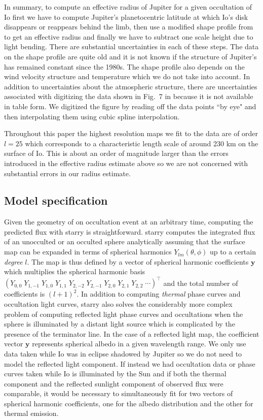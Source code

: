 \documentclass[modern]{aastex62}
\begin{document}
In summary, to compute an effective radius of Jupiter for a given occultation of Io first we have to compute Jupiter's planetocentric latitude at which Io's disk disappears or reappears behind the limb, then use a modified shape profile from \cite{lindal1981} to get an effective radius and finally we have to subtract one scale height due to light bending.
There are substantial uncertainties in each of these steps.
The data on the shape profile are quite old and it is not known if the structure of Jupiter's has remained constant since the 1980s. 
The shape profile also depends on the wind velocity structure and temperature which we do not take into account.
In addition to uncertainties about the atmospheric structure, there are uncertainties associated with digitizing the data shown in Fig.~7 in \cite{lindal1981} because it is not available in table form.
We digitized the figure by reading off the data points ``by eye" and then interpolating them using cubic spline interpolation.

Throughout this paper the highest resolution maps we fit to the data are of order $l=25$ which corresponds to a characteristic length scale of around 230 km on the surface of Io.
This is about an order of magnitude larger than the errors introduced in the effective radius estimate above so we are not concerned with substantial errors in our radius estimate.

\subsection{Model specification}
\label{ssec:model_spec}
Given the geometry of on occultation event at an arbitrary time, computing the predicted flux with \textsf{starry} is straightforward.
\textsf{starry} computes the integrated flux of an unocculted or an occulted sphere analytically assuming that the surface map can be expanded in terms of spherical harmonics $Y_{lm}(\theta,\phi)$ up to a certain \emph{degree} $l$.
The map is thus defined by a vector of spherical harmonic coefficients $\mathbf{y}$ which multiplies the spherical harmonic basis $\left(Y_{0,0}\;Y_{1,-1}\;Y_{1,0}\;Y_{1,1}\;Y_{2,-2}\;Y_{2,-1}\;Y_{2,0}\;Y_{2,1}\;Y_{2,2}\; \cdots\right)^{\top}$ and the total number of coefficients is $(l+1)^2$.
In addition to computing \emph{thermal} phase curves and occultation light curves, \textsf{starry} also solves the considerably more complex problem of computing reflected light phase curves and occultations when the sphere is illuminated by a distant light source \citep[Luger et al. 2021 in prep][]{} which is complicated by the presence of the terminator line.
In the case of a reflected light map, the coefficient vector $\mathbf{y}$ represents spherical albedo in a given wavelength range.
We only use data taken while Io was in eclipse shadowed by Jupiter so we do not need to model the reflected light component. 
If instead we had occultation data or phase curves taken while Io is illuminated by the Sun and if both the thermal component and the reflected sunlight component of observed flux were comparable, it would be necessary to simultaneously fit for two vectors of spherical harmonic coefficients, 
one for the albedo distribution and the other for thermal emission.
\end{document}
